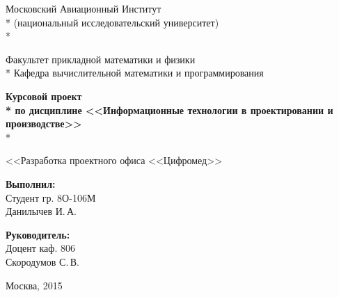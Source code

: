\begin{titlepage}

\newpage

\begin{center}
Московский Авиационный Институт \\*
(национальный исследовательский университет) \\*

\vspace{2em}

Факультет прикладной математики и физики \\*
Кафедра вычислительной математики и программирования

\vspace{10em}

\Large \textbf{Курсовой проект \\*
по дисциплине <<Информационные технологии в проектировании и производстве>>} \\*

\vspace{3em}

<<Разработка проектного офиса <<Цифромед>>
\end{center}

\vspace{8em}

\begin{minipage}[b]{22em}
  {\bfseries Выполнил:} \\
  \indent Студент гр. 8О-106М \\
  \indent Данилычев И.\,А.
\end{minipage} \begin{minipage}[b]{10em}
  {\bfseries Руководитель:} \\
  \indent Доцент каф. 806 \\
  \indent Скородумов С.\,В.
\end{minipage}

\vspace{\fill}

\begin{center}
Москва, 2015
\end{center}

\end{titlepage}
